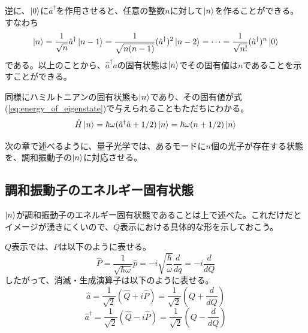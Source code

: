 逆に、$\ket 0$に$\hat a^\dagger$を作用させると、任意の整数$n$に対して$\ket n$を作ることができる。すなわち
\begin{equation}
  \ket n = \frac 1 {\sqrt n} \hat a^\dagger \ket {n - 1} 
  = \frac 1 {\sqrt{n(n-1)}} (\hat a^\dagger)^2\ket{n - 2} = \cdots 
  = \frac{1}{\sqrt{n!}}(\hat a^\dagger)^n\ket 0
\end{equation}
である。以上のことから、$\hat a^\dagger a$の固有状態は$\ket n$でその固有値は$n$であることを示すことができる。

同様にハミルトニアンの固有状態も$\ket n$であり、その固有値が式(\ref{eq:energy_of_eigenstate})で与えられることもただちにわかる。
\begin{equation}
  \hat H \ket n = \hbar \omega (\hat a^\dagger \hat a + 1/2)\ket n = \hbar \omega (n + 1/2)\ket n
\end{equation}

次の章で述べるように、量子光学では、あるモードに$n$個の光子が存在する状態を、調和振動子の$\ket n$に対応させる。

\subsection{調和振動子のエネルギー固有状態}
$\ket n$が調和振動子のエネルギー固有状態であることは上で述べた。これだけだとイメージが湧きにくいので、$Q$表示における具体的な形を示しておこう。

$Q$表示では、$P$は以下のように表せる。
\begin{equation}
  \hat P = \frac 1 {\sqrt{\hbar \omega}}\hat p = -i\sqrt{\frac{\hbar}{\omega}}\frac d {dq} = -i\frac{d}{dQ}
\end{equation}
したがって、消滅・生成演算子は以下のように表せる。
\begin{equation}
  \hat a = \frac{1}{\sqrt 2}(\hat Q + i\hat P) = \frac{1}{\sqrt 2}\left(Q + \frac d {dQ}\right)
\end{equation}
\begin{equation}
  \hat a^\dagger = \frac{1}{\sqrt 2}(\hat Q - i\hat P) = \frac{1}{\sqrt 2}\left(Q - \frac d {dQ}\right)
\end{equation}

